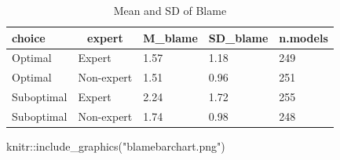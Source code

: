 \documentclass[
  man,floatsintext]{apa6}
\newenvironment{Shaded}{\begin{snugshade}}{\end{snugshade}}
\newcommand{\AttributeTok}[1]{\textcolor[rgb]{0.77,0.63,0.00}{#1}}
\newcommand{\ConstantTok}[1]{\textcolor[rgb]{0.00,0.00,0.00}{#1}}
\newcommand{\DecValTok}[1]{\textcolor[rgb]{0.00,0.00,0.81}{#1}}
\newcommand{\FunctionTok}[1]{\textcolor[rgb]{0.00,0.00,0.00}{#1}}
\newcommand{\NormalTok}[1]{#1}
\newcommand{\SpecialCharTok}[1]{\textcolor[rgb]{0.00,0.00,0.00}{#1}}
\newcommand{\StringTok}[1]{\textcolor[rgb]{0.31,0.60,0.02}{#1}}
\begin{document}
\begin{Shaded}
\end{Shaded}

\begin{table}[tbp]

\begin{center}
\begin{threeparttable}

\caption{\label{tab:table-table1}Mean and SD of Blame}

\begin{tabular}{lllll}
\toprule
choice & \multicolumn{1}{c}{expert} & \multicolumn{1}{c}{M\_blame} & \multicolumn{1}{c}{SD\_blame} & \multicolumn{1}{c}{n.models}\\
\midrule
Optimal & Expert & 1.57 & 1.18 & 249\\
Optimal & Non-expert & 1.51 & 0.96 & 251\\
Suboptimal & Expert & 2.24 & 1.72 & 255\\
Suboptimal & Non-expert & 1.74 & 0.98 & 248\\
\bottomrule
\end{tabular}

\end{threeparttable}
\end{center}

\end{table}



\begin{Shaded}
\begin{Highlighting}[]
\NormalTok{knitr}\SpecialCharTok{::}\FunctionTok{include\_graphics}\NormalTok{(}\StringTok{"blamebarchart.png"}\NormalTok{)}
\end{Highlighting}
\end{Shaded}
\end{document}
